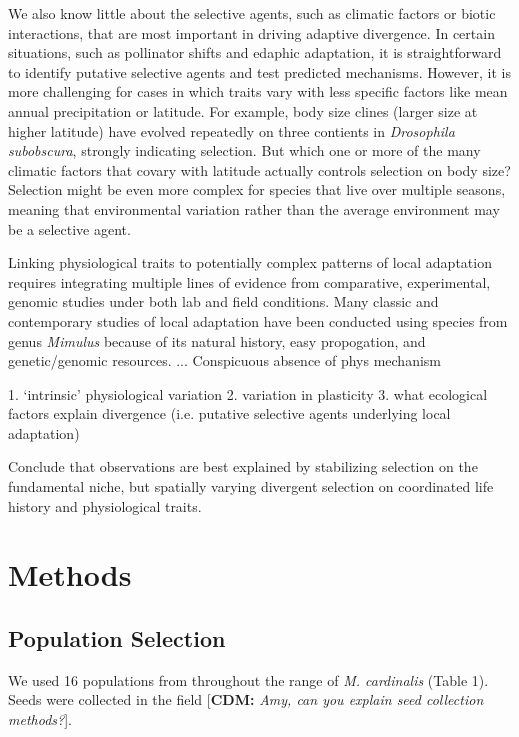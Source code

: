 \documentclass[11pt, oneside]{article}\usepackage[]{graphicx}\usepackage[]{color}
\newcommand{\cdm}[1]{{ \color{magenta} [{\bf{CDM:}} {\em#1}]}} %
\begin{document}
We also know little about the selective agents, such as climatic factors or biotic interactions, that are most important in driving adaptive divergence. In certain situations, such as pollinator shifts and edaphic adaptation, it is straightforward to identify putative selective agents and test predicted mechanisms. However, it is more challenging for cases in which traits vary with less specific factors like mean annual precipitation or latitude. For example, body size clines (larger size at higher latitude) have evolved repeatedly on three contients in \textit{Drosophila subobscura}, strongly indicating selection. But which one or more of the many climatic factors that covary with latitude actually controls selection on body size? Selection might be even more complex for species that live over multiple seasons, meaning that environmental variation rather than the average environment may be a selective agent.

Linking physiological traits to potentially complex patterns of local adaptation requires integrating multiple lines of evidence from comparative, experimental, genomic studies under both lab and field conditions. Many classic and contemporary studies of local adaptation have been conducted using species from genus \textit{Mimulus} because of its natural history, easy propogation, and genetic/genomic resources. ... Conspicuous absence of phys mechanism

1. `intrinsic' physiological variation
2. variation in plasticity
3. what ecological factors explain divergence (i.e. putative selective agents underlying local adaptation)

Conclude that observations are best explained by stabilizing selection on the fundamental niche, but spatially varying divergent selection on coordinated life history and physiological traits.

\section*{Methods}

\subsection*{Population Selection}

We used 16 populations from throughout the range of \textit{M. cardinalis} (Table 1). Seeds were collected in the field \cdm{Amy, can you explain seed collection methods?}.
\end{document}
